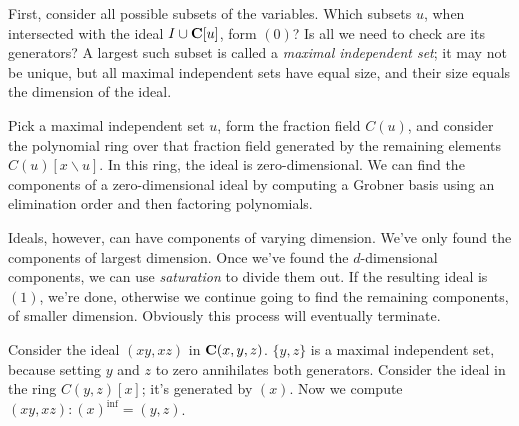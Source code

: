 First, consider all possible subsets of the variables.  Which subsets $u$,
when intersected with the ideal $I \cup {\bf C}[u]$, form $(0)$?
Is all we need to check are its generators?
A largest such
subset is called a {\it maximal independent set}; it may not be unique, but
all maximal independent sets have equal size, and their size equals the dimension of the ideal.

Pick a maximal independent set $u$, form the fraction field $C(u)$, and consider the
polynomial ring over that fraction field generated by the remaining elements $C(u)[x\backslash u]$.
In this ring, the ideal is zero-dimensional.  We can find the components of a zero-dimensional
ideal by computing a Grobner basis using an elimination order and then factoring polynomials.

Ideals, however, can have components of varying dimension.  We've only found the
components of largest dimension.  Once we've found the $d$-dimensional components,
we can use {\it saturation} to divide them out.  If the resulting ideal is $(1)$,
we're done, otherwise we continue going to find the remaining components,
of smaller dimension.  Obviously this process will eventually terminate.

Consider the ideal $(xy,xz)$ in ${\bf C}(x,y,z)$.  $\{y,z\}$ is a maximal independent set,
because setting $y$ and $z$ to zero annihilates both generators.
Consider the ideal in the ring $C(y,z)[x]$; it's generated by $(x)$.  Now we
compute $(xy,xz) : (x)^\inf = (y,z)$.

\begin{comment}

\mysection{Axiom Soup}

At this point, the reader might begin to suspect that we build up a
theory from our axioms, and whenever we get stuck, we introduce a new
axiom so that we can move forward!  In a sense, this is true, but
don't miss an important point.  While the axioms are axioms in the
sense that you can't prove U1 or I1 for an arbitrary ring (i.e, just
given the R axioms), they are also theorems in the sense that we can
prove them for the particular systems of interest to us.  We prove the
axioms both for our base system ${\bf Z}$ (the integers form a unique
factorization domain), and for any constructed system ${\cal F}[x]$ (a
polynomial ring in a single {\it transcendental} variable over a field
is also a unique factorization domain).

Let me close this chapter by proving this in a series of theorems.

\end{comment}

